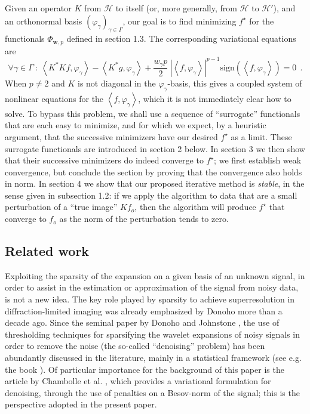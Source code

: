 \documentclass[10pt]{article}
\def\cH{\mathcal{H}}
\def\K{K^*}
\def\ag{w_{\gamma}}
\def\vpg{\varphi_{\gamma}}
\begin{document}
Given an operator $K$ from $\cH$ to itself (or, more generally, from
$\cH$ to $\cH'$), and an orthonormal basis
$(\vpg)_{\gamma \in \Gamma}$, our goal is to find minimizing
$f^\star$ for the functionals $\Phi_{\mathbf{w},p}$ defined in section
1.3. The corresponding variational equations are
\begin{equation}
\label{variational}
\forall \gamma \in \Gamma ~ : ~
\left< \K Kf, \vpg \right> - \left< \K g , \vpg \right>
+ \frac{ \ag p}{2}~ | \left< f, \vpg\right> |^{p-1}
\mbox{sign}(\left< f, \vpg\right>) = 0 ~~.
\end{equation}
When $p \neq 2$ and $K$ is not diagonal in the
$\vpg$-basis, this gives a coupled system of
nonlinear equations for the $\left<f, \vpg \right>$,
which it is not immediately clear how to solve.
To bypass this problem, we
shall use a sequence of ``surrogate'' functionals that are each
easy to minimize,
and for which we expect, by a heuristic argument, that the successive
minimizers have our desired $f^\star$ as a limit.
These surrogate
functionals  are introduced in section 2 below. In section 3 we then show that
their successive minimizers do indeed converge to $f^\star$; we first
establish weak convergence, but conclude the section by proving that the
convergence also holds in norm. In section 4 we show that our proposed
iterative method is {\em stable}, in the sense given in subsection 1.2: if we
apply the algorithm to data that are a small perturbation of a ``true image''
$K f_o$,
then the algorithm will produce $f^\star$ that converge
to $f_o$ as the norm of the perturbation tends to zero.

\subsection{Related work}


Exploiting the sparsity of the expansion on a given basis
of an unknown signal, in order to assist in the estimation
or approximation of the signal from noisy data, is not a new
idea. The key role played by sparsity to achieve superresolution
in diffraction-limited imaging was already emphasized by Donoho
\cite{Don92} more than a decade ago. Since the seminal paper by Donoho
and Johnstone \cite{Don94}, the use of thresholding techniques for
sparsifying the wavelet expansions of noisy signals in order to remove the
noise (the so-called ``denoising'' problem) has been abundantly discussed in
the literature, mainly in a statistical framework (see e.g.
the book \cite{Mal98}).
Of particular importance for the background of this paper is the article by
Chambolle et al. \cite{Cha98}, which provides a variational formulation
for denoising, through the use of penalties on a Besov-norm of
the signal; this is the perspective adopted in the present paper.
\end{document}
